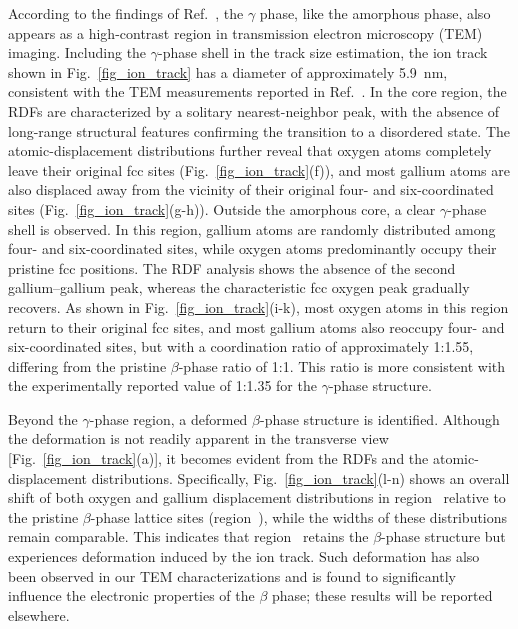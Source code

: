 \documentclass[aip,graphicx,amsmath,amssymb]{revtex4-1}
\begin{document}
According to the findings of Ref.~, the $\gamma$ phase,
like the amorphous phase, also appears as a high-contrast region in transmission electron
microscopy (TEM) imaging. Including the $\gamma$-phase shell in the track size estimation,
the ion track shown in Fig.~\ref{fig_ion_track} has a diameter of approximately 5.9~nm,
consistent with the TEM measurements reported in Ref.~.
In the core region, the RDFs are characterized by a solitary nearest-neighbor peak, 
with the absence of long-range structural features confirming the transition to a disordered state.
The atomic-displacement distributions further reveal that oxygen atoms completely leave
their original fcc sites (Fig.~\ref{fig_ion_track}(f)), and most gallium atoms are also displaced away from the vicinity of
their original four- and six-coordinated sites (Fig.~\ref{fig_ion_track}(g-h)).
Outside the amorphous core, a clear $\gamma$-phase shell is observed.
In this region, gallium atoms are randomly distributed among four- and six-coordinated
sites, while oxygen atoms predominantly occupy their pristine fcc positions.
The RDF analysis shows the absence of the second gallium--gallium peak, whereas the characteristic
fcc oxygen peak gradually recovers.
As shown in Fig.~\ref{fig_ion_track}(i-k), most oxygen atoms in this region return to their
original fcc sites, and most gallium atoms also reoccupy four- and six-coordinated sites,
but with a coordination ratio of approximately 1:1.55, differing from the pristine
$\beta$-phase ratio of 1:1.
This ratio is more consistent with the experimentally reported value of 1:1.35 for the
$\gamma$-phase structure.\cite{playford_structures_2013} 

Beyond the $\gamma$-phase region, a deformed $\beta$-phase structure is identified.
Although the deformation is not readily apparent in the transverse view
[Fig.~\ref{fig_ion_track}(a)], it becomes evident from the RDFs and the atomic-displacement
distributions.
Specifically, Fig.~\ref{fig_ion_track}(l-n) shows an overall shift of both oxygen and gallium
displacement distributions in region~ relative to the pristine $\beta$-phase
lattice sites (region~), while the widths of these distributions remain comparable.
This indicates that region~ retains the $\beta$-phase structure but experiences 
deformation induced by the ion track.
Such deformation has also been observed in our TEM characterizations and is found to
significantly influence the electronic properties of the $\beta$ phase; these results will
be reported elsewhere.
\end{document}
